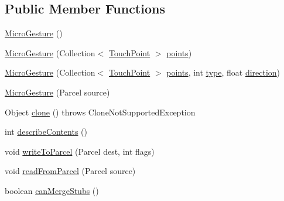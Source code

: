\subsection*{Public Member Functions}
\begin{DoxyCompactItemize}
\item 
\hyperlink{classch_1_1zhaw_1_1ba10__bsha__1_1_1service_1_1MicroGesture_a751ff230434387aa91538c649520745b}{MicroGesture} ()
\item 
\hyperlink{classch_1_1zhaw_1_1ba10__bsha__1_1_1service_1_1MicroGesture_aef999428ccd948a1f401fff6b3787735}{MicroGesture} (Collection$<$ \hyperlink{classch_1_1zhaw_1_1ba10__bsha__1_1_1TouchPoint}{TouchPoint} $>$ \hyperlink{classch_1_1zhaw_1_1ba10__bsha__1_1_1service_1_1MicroGesture_a3eb0c61e8503400680d21d305ca58356}{points})
\item 
\hyperlink{classch_1_1zhaw_1_1ba10__bsha__1_1_1service_1_1MicroGesture_afc2e5298086d59136576c9f232f68b2c}{MicroGesture} (Collection$<$ \hyperlink{classch_1_1zhaw_1_1ba10__bsha__1_1_1TouchPoint}{TouchPoint} $>$ \hyperlink{classch_1_1zhaw_1_1ba10__bsha__1_1_1service_1_1MicroGesture_a3eb0c61e8503400680d21d305ca58356}{points}, int \hyperlink{classch_1_1zhaw_1_1ba10__bsha__1_1_1service_1_1MicroGesture_ac1ee8b835a0b20d0e3535682eb0d2741}{type}, float \hyperlink{classch_1_1zhaw_1_1ba10__bsha__1_1_1service_1_1MicroGesture_a99f2fb0a7f8e2667b5fb8043dde76ff8}{direction})
\item 
\hyperlink{classch_1_1zhaw_1_1ba10__bsha__1_1_1service_1_1MicroGesture_a915edd1a693527b48678802234a9d37d}{MicroGesture} (Parcel source)
\item 
Object \hyperlink{classch_1_1zhaw_1_1ba10__bsha__1_1_1service_1_1MicroGesture_a8fcc5afd682a4e6f39d6a813903e483f}{clone} ()  throws CloneNotSupportedException 
\item 
int \hyperlink{classch_1_1zhaw_1_1ba10__bsha__1_1_1service_1_1MicroGesture_a907d378703ba728992346b911b127339}{describeContents} ()
\item 
void \hyperlink{classch_1_1zhaw_1_1ba10__bsha__1_1_1service_1_1MicroGesture_ad934b5c1c2c627ea41d1a4d81d30e448}{writeToParcel} (Parcel dest, int flags)
\item 
void \hyperlink{classch_1_1zhaw_1_1ba10__bsha__1_1_1service_1_1MicroGesture_ad3f092e31d34245e598866b7e11e8d42}{readFromParcel} (Parcel source)
\item 
boolean \hyperlink{classch_1_1zhaw_1_1ba10__bsha__1_1_1service_1_1MicroGesture_af67a2c2d66724e55b7b3af29e220b91c}{canMergeStubs} ()
\item 

\end{DoxyCompactItemize}
